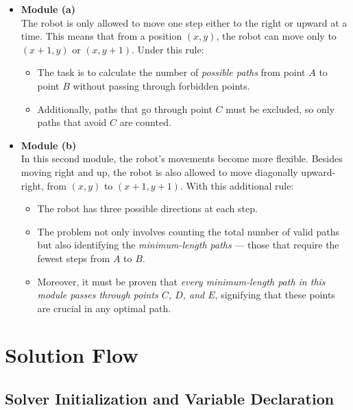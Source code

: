 \documentclass[11pt,a4paper
]{article}
\begin{document}
\begin{itemize}
  \item \textbf{Module (a)}\\
        The robot is only allowed to move one step either to the right or upward at a time. This means that from a position \( (x, y) \), the robot can move only to \( (x+1, y) \) or \( (x, y+1) \). Under this rule:
        \begin{itemize}
          \item The task is to calculate the number of \textit{possible paths} from point \( A \) to point \( B \) without passing through forbidden points.
          \item Additionally, paths that go through point \( C \) must be excluded, so only paths that avoid \( C \) are counted.
        \end{itemize}

  \item \textbf{Module (b)}\\
        In this second module, the robot's movements become more flexible. Besides moving right and up, the robot is also allowed to move diagonally upward-right, from \( (x, y) \) to \( (x+1, y+1) \). With this additional rule:
        \begin{itemize}
          \item The robot has three possible directions at each step.
          \item The problem not only involves counting the total number of valid paths but also identifying the \textit{minimum-length paths} — those that require the fewest steps from \( A \) to \( B \).
          \item Moreover, it must be proven that \textit{every minimum-length path in this module passes through points \( C \), \( D \), and \( E \)}, signifying that these points are crucial in any optimal path.
        \end{itemize}
\end{itemize}

\newpage
\section*{Solution Flow}
\subsection*{Solver Initialization and Variable Declaration}
\end{document}
